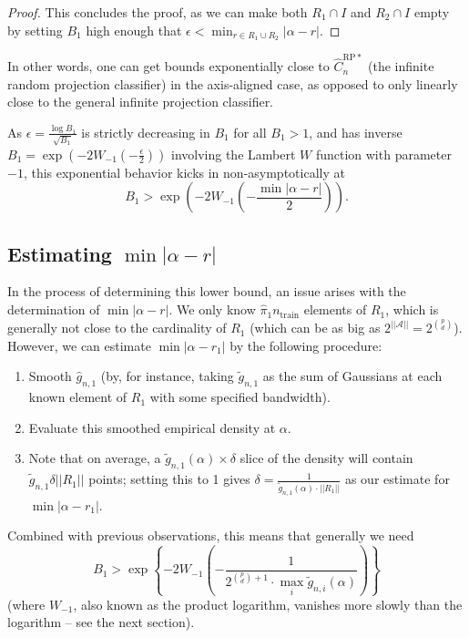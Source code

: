 \documentclass{amsart}
\newcommand\crpnhatstar{\hat{C}_{n}^{\mathrm{RP*}}}
\begin{document}
\begin{proof}
This concludes the proof, as we can make both $R_{1}\cap I$
and $R_{2}\cap I$ empty by setting $B_{1}$ high enough that $\epsilon<\min_{r\in R_{1}\cup R_{2}}|\alpha-r|$.
\end{proof}

In other words, one can get bounds exponentially close to $\crpnhatstar$
(the infinite random projection classifier) in the axis-aligned case, as opposed to only
linearly close to the general infinite projection classifier.

As $\epsilon=\frac{\log B_{1}}{\sqrt{B_{1}}}$ is strictly decreasing in $B_{1}$
for all $B_{1}>1$, and has inverse $B_{1}=\exp\left(-2W_{-1}(-\frac{\epsilon}{2})\right)$
involving the Lambert $W$ function \cite{CGHJK96} with parameter $-1$, this exponential behavior kicks in non-asymptotically at
\[
B_{1}>\exp\left(-2W_{-1}\left(-\frac{\min|\alpha-r|}{2}\right)\right).
\]

\subsection{Estimating $\min|\alpha-r|$}

In the process of determining this lower bound, an issue arises with the determination of $\min|\alpha-r|$.
We only know $\hat{\pi}_{1}n_{\mathrm{train}}$ elements of $R_{1}$, which is generally not close to the cardinality of $R_{1}$ (which can be as big as $2^{||\mathcal{A}||}=2^{\binom{p}{d}}$).
However, we can estimate $\min|\alpha-r_{1}|$ by the following procedure:
\begin{enumerate}
\item Smooth $\hat{g}_{n,1}$ (by, for instance, taking $\tilde{g}_{n,1}$
as the sum of Gaussians at each known element of $R_{1}$ with some
specified bandwidth).
\item Evaluate this smoothed empirical density at $\alpha$.
\item Note that on average, a $\tilde{g}_{n,1}(\alpha)\times\delta$ slice
of the density will contain $\tilde{g}_{n,1}\delta||R_{1}||$ points;
setting this to 1 gives $\delta=\frac{1}{\tilde{g}_{n,1}(\alpha)\cdot||R_{1}||}$
as our estimate for $\min|\alpha-r_{1}|$.
\end{enumerate}
Combined with previous observations, this means that generally we
need 
\[
B_{1}>\exp\left\{ -2W_{-1}\left(-\frac{1}{2^{\binom{p}{d}+1}\cdot\max_i\tilde{g}_{n,i}(\alpha)}\right)\right\} 
\]
 (where $W_{-1}$, also known as the product logarithm, vanishes
more slowly than the logarithm -- see the next section).
\end{document}
